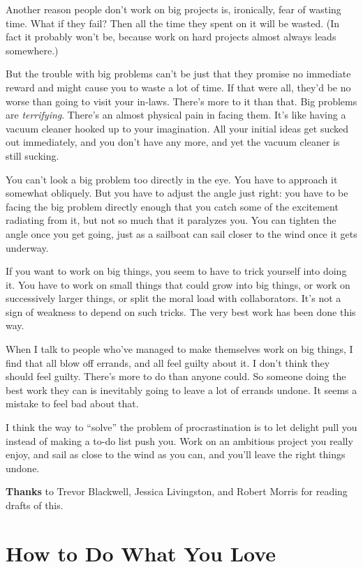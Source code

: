 \documentclass[12pt]{book}
\begin{document}
Another reason people don't work on big projects is, ironically, fear of
wasting time. What if they fail? Then all the time they spent on it will
be wasted. (In fact it probably won't be, because work on hard projects
almost always leads somewhere.)

But the trouble with big problems can't be just that they promise no
immediate reward and might cause you to waste a lot of time. If that
were all, they'd be no worse than going to visit your in-laws. There's
more to it than that. Big problems are \emph{terrifying}. There's an
almost physical pain in facing them. It's like having a vacuum cleaner
hooked up to your imagination. All your initial ideas get sucked out
immediately, and you don't have any more, and yet the vacuum cleaner is
still sucking.

You can't look a big problem too directly in the eye. You have to
approach it somewhat obliquely. But you have to adjust the angle just
right: you have to be facing the big problem directly enough that you
catch some of the excitement radiating from it, but not so much that it
paralyzes you. You can tighten the angle once you get going, just as a
sailboat can sail closer to the wind once it gets underway.

If you want to work on big things, you seem to have to trick yourself
into doing it. You have to work on small things that could grow into big
things, or work on successively larger things, or split the moral load
with collaborators. It's not a sign of weakness to depend on such
tricks. The very best work has been done this way.

When I talk to people who've managed to make themselves work on big
things, I find that all blow off errands, and all feel guilty about it.
I don't think they should feel guilty. There's more to do than anyone
could. So someone doing the best work they can is inevitably going to
leave a lot of errands undone. It seems a mistake to feel bad about
that.

I think the way to ``solve'' the problem of procrastination is to let
delight pull you instead of making a to-do list push you. Work on an
ambitious project you really enjoy, and sail as close to the wind as you
can, and you'll leave the right things undone.

\textbf{Thanks} to Trevor Blackwell, Jessica Livingston, and Robert
Morris for reading drafts of this.
\chapter{How to Do What You Love}
\end{document}
